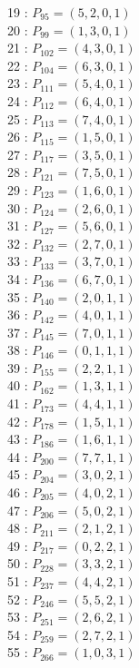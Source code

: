 \documentclass{article}
\begin{document}
{\begin{multicols}{3}
19 : $P_{95}=( 5, 2, 0, 1 )$\\
20 : $P_{99}=( 1, 3, 0, 1 )$\\
21 : $P_{102}=( 4, 3, 0, 1 )$\\
22 : $P_{104}=( 6, 3, 0, 1 )$\\
23 : $P_{111}=( 5, 4, 0, 1 )$\\
24 : $P_{112}=( 6, 4, 0, 1 )$\\
25 : $P_{113}=( 7, 4, 0, 1 )$\\
26 : $P_{115}=( 1, 5, 0, 1 )$\\
27 : $P_{117}=( 3, 5, 0, 1 )$\\
28 : $P_{121}=( 7, 5, 0, 1 )$\\
29 : $P_{123}=( 1, 6, 0, 1 )$\\
30 : $P_{124}=( 2, 6, 0, 1 )$\\
31 : $P_{127}=( 5, 6, 0, 1 )$\\
32 : $P_{132}=( 2, 7, 0, 1 )$\\
33 : $P_{133}=( 3, 7, 0, 1 )$\\
34 : $P_{136}=( 6, 7, 0, 1 )$\\
35 : $P_{140}=( 2, 0, 1, 1 )$\\
36 : $P_{142}=( 4, 0, 1, 1 )$\\
37 : $P_{145}=( 7, 0, 1, 1 )$\\
38 : $P_{146}=( 0, 1, 1, 1 )$\\
39 : $P_{155}=( 2, 2, 1, 1 )$\\
40 : $P_{162}=( 1, 3, 1, 1 )$\\
41 : $P_{173}=( 4, 4, 1, 1 )$\\
42 : $P_{178}=( 1, 5, 1, 1 )$\\
43 : $P_{186}=( 1, 6, 1, 1 )$\\
44 : $P_{200}=( 7, 7, 1, 1 )$\\
45 : $P_{204}=( 3, 0, 2, 1 )$\\
46 : $P_{205}=( 4, 0, 2, 1 )$\\
47 : $P_{206}=( 5, 0, 2, 1 )$\\
48 : $P_{211}=( 2, 1, 2, 1 )$\\
49 : $P_{217}=( 0, 2, 2, 1 )$\\
50 : $P_{228}=( 3, 3, 2, 1 )$\\
51 : $P_{237}=( 4, 4, 2, 1 )$\\
52 : $P_{246}=( 5, 5, 2, 1 )$\\
53 : $P_{251}=( 2, 6, 2, 1 )$\\
54 : $P_{259}=( 2, 7, 2, 1 )$\\
55 : $P_{266}=( 1, 0, 3, 1 )$\\

\end{multicols}}
\end{document}
